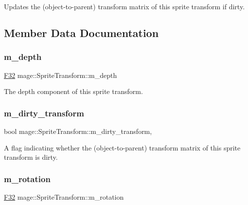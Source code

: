 Updates the (object-\/to-\/parent) transform matrix of this sprite transform if dirty. 

\subsection{Member Data Documentation}
\hypertarget{classmage_1_1_sprite_transform_a646e129b2e9702eec23b4c673f07dfef}{}\label{classmage_1_1_sprite_transform_a646e129b2e9702eec23b4c673f07dfef} 
\subsubsection{\texorpdfstring{m\+\_\+depth}{m\_depth}}
{\footnotesize\ttfamily \hyperlink{namespacemage_aa97e833b45f06d60a0a9c4fc22ae02c0}{F32} mage\+::\+Sprite\+Transform\+::m\+\_\+depth\hspace{0.3cm}{\ttfamily [private]}}

The depth component of this sprite transform. \hypertarget{classmage_1_1_sprite_transform_a3072ed606f16d14d16cdad46438e9cf3}{}\label{classmage_1_1_sprite_transform_a3072ed606f16d14d16cdad46438e9cf3} 
\subsubsection{\texorpdfstring{m\+\_\+dirty\+\_\+transform}{m\_dirty\_transform}}
{\footnotesize\ttfamily bool mage\+::\+Sprite\+Transform\+::m\+\_\+dirty\+\_\+transform\hspace{0.3cm}{\ttfamily [mutable]}, {\ttfamily [private]}}

A flag indicating whether the (object-\/to-\/parent) transform matrix of this sprite transform is dirty. \hypertarget{classmage_1_1_sprite_transform_a7c705543e7f6a9c7e7a517ffef2cb4b9}{}\label{classmage_1_1_sprite_transform_a7c705543e7f6a9c7e7a517ffef2cb4b9} 
\subsubsection{\texorpdfstring{m\+\_\+rotation}{m\_rotation}}
{\footnotesize\ttfamily \hyperlink{namespacemage_aa97e833b45f06d60a0a9c4fc22ae02c0}{F32} mage\+::\+Sprite\+Transform\+::m\+\_\+rotation\hspace{0.3cm}{\ttfamily [private]}}

